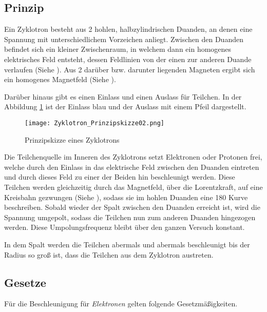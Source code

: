 \subsection{Prinzip} 

Ein Zyklotron besteht aus 2 hohlen, halbzylindrischen Duanden, an denen eine Spannung mit unterschiedlichem Vorzeichen anliegt. Zwischen den Duanden befindet sich ein kleiner Zwischenraum, in welchem dann ein homogenes elektrisches Feld entsteht, dessen Feldlinien von der einen zur anderen Duande verlaufen (Siehe ). Aus 2 darüber bzw. darunter liegenden Magneten ergibt sich ein homogenes Magnetfeld (Siehe ).

Darüber hinaus gibt es einen Einlass und einen Auslass für Teilchen. In der Abbildung \ref{fig:Zyklo} ist der Einlass blau und der Auslass mit einem Pfeil dargestellt.


\begin{figure}[h!]
	\centering
	\texttt{[image: Zyklotron\_Prinzipskizze02.png]}
	\caption{Prinzipskizze eines Zyklotrons}
	\label{fig:Zyklo}
\end{figure}

Die Teilchenquelle im Inneren des Zyklotrons setzt Elektronen oder Protonen frei, welche durch den Einlass in das elektrische Feld zwischen den Duanden eintreten und durch dieses Feld zu einer der Beiden hin beschleunigt werden. Diese Teilchen werden gleichzeitig durch das Magnetfeld, über die Lorentzkraft, auf eine Kreisbahn gezwungen (Siehe ), sodass sie im hohlen Duanden eine 180\degree{} Kurve beschreiben. Sobald wieder der Spalt zwischen den Duanden erreicht ist, wird die Spannung umgepolt, sodass die Teilchen nun zum anderen Duanden hingezogen werden. Diese Umpolungsfrequenz bleibt über den ganzen Versuch konstant.

In dem Spalt werden die Teilchen abermals und abermals beschleunigt bis der Radius so groß ist, dass die Teilchen aus dem Zyklotron austreten.


\subsection{Gesetze}

Für die Beschleunigung für \emph{Elektronen} gelten folgende Gesetzmäßigkeiten.

